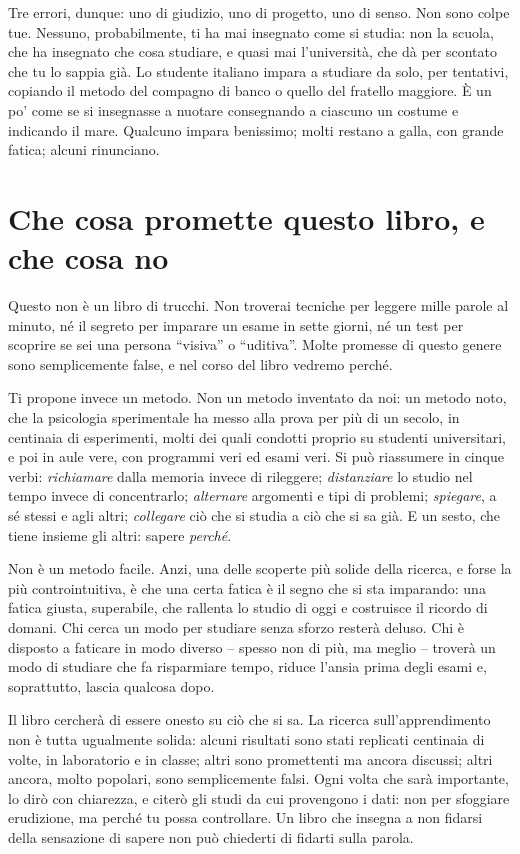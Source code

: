 \asterismo

Tre errori, dunque: uno di giudizio, uno di progetto, uno di senso. Non
sono colpe tue. Nessuno, probabilmente, ti ha mai insegnato come si
studia: non la scuola, che ha insegnato che cosa studiare, e quasi mai
l'università, che dà per scontato che tu lo sappia già. Lo studente
italiano impara a studiare da solo, per tentativi, copiando il metodo
del compagno di banco o quello del fratello maggiore. È un po' come se
si insegnasse a nuotare consegnando a ciascuno un costume e indicando
il mare. Qualcuno impara benissimo; molti restano a galla, con grande
fatica; alcuni rinunciano.

\section{Che cosa promette questo libro, e che cosa no}

Questo non è un libro di trucchi. Non troverai tecniche per leggere
mille parole al minuto, né il segreto per imparare un esame in sette
giorni, né un test per scoprire se sei una persona \enquote{visiva} o
\enquote{uditiva}. Molte promesse di questo genere sono semplicemente
false, e nel corso del libro vedremo perché.

Ti propone invece un metodo. Non un metodo inventato da noi: un
metodo noto, che la psicologia sperimentale ha messo alla prova per più
di un secolo, in centinaia di esperimenti, molti dei quali condotti
proprio su studenti universitari, e poi in aule vere, con programmi
veri ed esami veri. Si può riassumere in cinque verbi:
\emph{richiamare} dalla memoria invece di rileggere; \emph{distanziare}
lo studio nel tempo invece di concentrarlo; \emph{alternare} argomenti
e tipi di problemi; \emph{spiegare}, a sé stessi e agli altri;
\emph{collegare} ciò che si studia a ciò che si sa già. E un sesto, che
tiene insieme gli altri: sapere \emph{perché}.

Non è un metodo facile. Anzi, una delle scoperte più solide della
ricerca, e forse la più controintuitiva, è che una certa fatica è il
segno che si sta imparando: una fatica giusta, superabile, che rallenta
lo studio di oggi e costruisce il ricordo di domani. Chi cerca un modo
per studiare senza sforzo resterà deluso. Chi è disposto a faticare in
modo diverso -- spesso non di più, ma meglio -- troverà un modo di
studiare che fa risparmiare tempo, riduce l'ansia prima degli esami e,
soprattutto, lascia qualcosa dopo.

Il libro cercherà di essere onesto su ciò che si sa. La ricerca
sull'apprendimento non è tutta ugualmente solida: alcuni risultati sono
stati replicati centinaia di volte, in laboratorio e in classe; altri
sono promettenti ma ancora discussi; altri ancora, molto popolari, sono
semplicemente falsi. Ogni volta che sarà importante, lo dirò con
chiarezza, e citerò gli studi da cui provengono i dati: non per
sfoggiare erudizione, ma perché tu possa controllare. Un libro che
insegna a non fidarsi della sensazione di sapere non può chiederti di
fidarti sulla parola.

